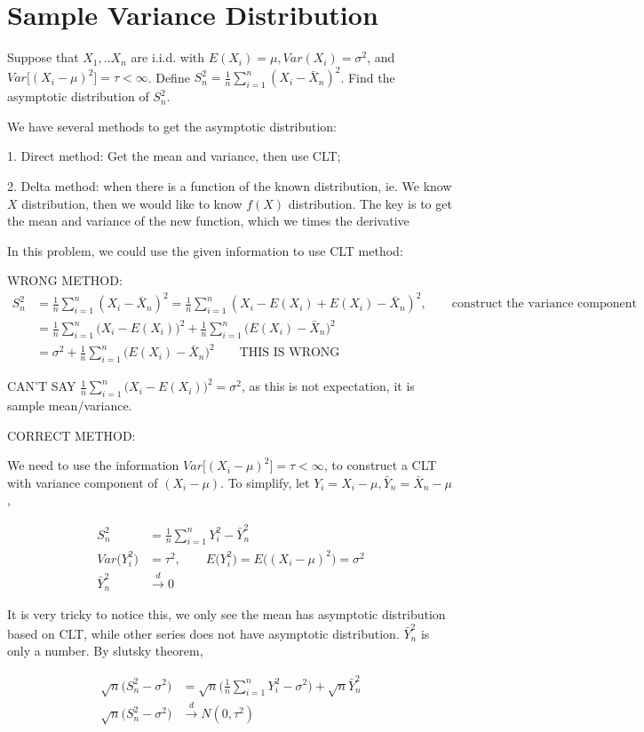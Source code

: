 \section{Sample Variance Distribution}

Suppose that $X_1,..X_n$ are i.i.d. with $E(X_i) = \mu, Var(X_i) = \sigma^2$, and $Var\Big[ (X_i- \mu)^2 \Big] = \tau < \infty$. Define $S_n^2 = \frac{1}{n} \sum_{i=1}^n (X_i - \bar{X}_n)^2$. Find the asymptotic distribution of $S_n^2 $.

We have several methods to get the asymptotic distribution:

1. Direct method: Get the mean and variance, then use CLT;

2. Delta method: when there is a function of the known distribution, ie. We know $X$ distribution, then we would like to know $f(X)$ distribution. The key is to get the mean and variance of the new function, which we times the derivative

In this problem, we could use the given information to use CLT method:

WRONG METHOD:
\begin{align*}
S_n^2 &= \frac{1}{n} \sum_{i=1}^n (X_i - \bar{X}_n)^2 = \frac{1}{n} \sum_{i=1}^n (X_i - E(X_i) + E(X_i) - \bar{X}_n)^2, \qquad \text{construct the variance component} \\
&= \frac{1}{n}\sum_{i=1}^n  \Big(X_i - E(X_i) \Big)^2 + \frac{1}{n}\sum_{i=1}^n \Big(E(X_i) - \bar{X}_n \Big)^2 \\
&= \sigma^2 +  \frac{1}{n}\sum_{i=1}^n \Big(E(X_i) - \bar{X}_n \Big)^2  \qquad \text{THIS IS WRONG}
\end{align*}

CAN'T SAY $\frac{1}{n}\sum_{i=1}^n  \Big(X_i - E(X_i) \Big)^2 =  \sigma^2 $, as this is not expectation, it is sample mean/variance. 


CORRECT METHOD:

We need to use the information $Var\Big[ (X_i- \mu)^2 \Big] = \tau < \infty$, to construct a CLT with variance component of $(X_i- \mu)$. 
To simplify, let $Y_i= X_i - \mu, \bar{Y}_n= \bar{X}_n - \mu$,

\begin{align*}
S_n^2 &=  \frac{1}{n} \sum_{i=1}^n Y_i^2 - \bar{Y}_n^2 \\
Var \Big( Y_i^2 \Big) &= \tau^2, \qquad E \Big( Y_i^2 \Big) = E \Big( (X_i - \mu)^2 \Big) = \sigma^2 \\
\bar{Y}_n^2 & \xrightarrow{d} 0
\end{align*}

It is very tricky to notice this, we only see the mean has asymptotic distribution based on CLT, while other series does not have asymptotic distribution. $\bar{Y}_n^2$ is only a number.
By slutsky theorem,

\begin{align*}
\sqrt{n} \Big(S_n^2 - \sigma^2 \Big) &= \sqrt{n} \Big(\frac{1}{n} \sum_{i=1}^n Y_i^2 - \sigma^2 \Big) + \sqrt{n} \bar{Y}_n^2 \\
\sqrt{n} \Big(S_n^2 - \sigma^2 \Big) & \xrightarrow{d} N(0, \tau^2)
\end{align*}



